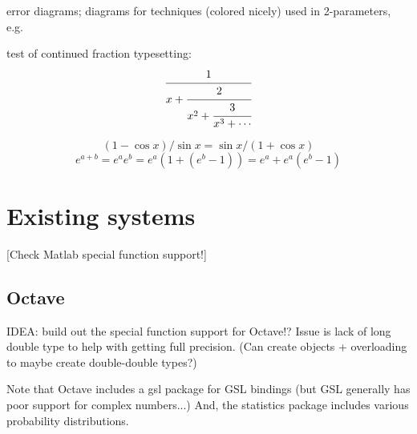 \documentclass[10pt,dvipdfmx,letterpaper,twoside]{article}
\begin{document}
error diagrams; diagrams for techniques (colored nicely) used in 2-parameters, e.g.

test of continued fraction typesetting:
\[ \cfrac{1}{x + \cfrac{2}{x^2 + \cfrac{3}{x^3 + \cdots }}} \]

\[(1-\cos x)/\sin x = \sin x / (1+\cos x) \]
\[ e^{a+b} = e^{a}e^{b} = e^{a}(1+(e^{b}-1)) = e^{a} + e^{a}(e^{b}-1) \]

\section{Existing systems}

[Check Matlab special function support!]

\subsection{Octave}

IDEA: build out the special function support for Octave!?  Issue is lack of
long double type to help with getting full precision.
(Can create objects + overloading to maybe create double-double types?)

Note that Octave includes a gsl package for GSL bindings (but GSL generally has poor support for complex numbers...)
And, the statistics package includes various probability distributions.
\end{document}
